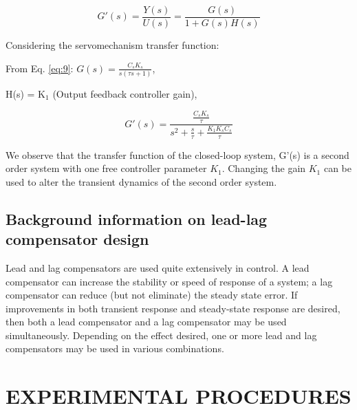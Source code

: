 \documentclass[11pt,a4paper]{article}
\begin{document}
\begin{equation} \label{eq:15}
G'(s)=\frac{Y(s)}{U(s)}=\frac{G(s)}{1+G(s)H(s)}
\end{equation}

Considering the servomechanism transfer function:

From Eq. \ref{eq:9}: $G(s)=\frac{C_{s}K_{s}}{s(\tau s + 1)}$,

H(s) = K$_{1}$ (Output feedback controller gain),

\begin{equation} \label{eq:16}
G'(s)=\frac{\frac{C_{s}K_{s}}{\tau}}{s^{2} + \frac{s}{\tau} + \frac{K_{1}K_{s}C_{s}}{\tau}}
\end{equation}

We observe that the transfer function of the closed-loop system, G'(s) is a second order system with one free controller parameter $K_{1}$. Changing the gain $K_{1}$ can be used to alter the transient dynamics of the second order system.

\subsection{Background information on lead-lag compensator design}
Lead and lag compensators are used quite extensively in control. A lead compensator can increase the stability or speed of response of a system; a lag compensator can reduce (but not eliminate) the steady state error. If improvements in both transient response and steady-state response are desired, then both a lead compensator and a lag compensator may be used simultaneously. Depending on the effect desired, one or more lead and lag compensators may be used in various combinations.



\section{EXPERIMENTAL PROCEDURES}
\end{document}
